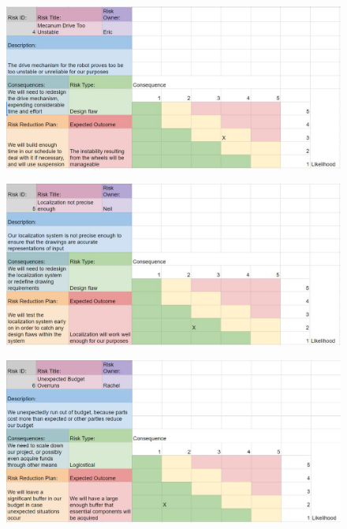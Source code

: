 \begin{figure}[h!]
\centering
\includegraphics[width=0.98\columnwidth]{risks/risk4.JPG}
\label{fig:risk4}
\end{figure}
\begin{figure}[h!]
\centering
\includegraphics[width=0.98\columnwidth]{risks/risk5.JPG}
\label{fig:risk5}
\end{figure}
\begin{figure}[h!]
\centering
\includegraphics[width=0.98\columnwidth]{risks/risk6.JPG}
\label{fig:risk6}
\end{figure}

\clearpage
